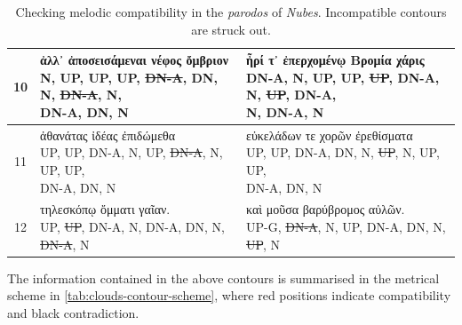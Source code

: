\documentclass[twoside]{article}
\begin{document}
\begin{table}[ht]
{\begin{tabular}{c l l}
            \hline
            
            10 &
            \makecell[l]{\textgreek{ἀλλ᾽ ἀποσεισάμεναι νέφος ὄμβριον}\\
            N, UP, UP, UP, \sout{DN-A}, DN, N, \sout{DN-A}, N,\\ 
            DN-A, DN, N} & %
            \makecell[l]{\textgreek{ἦρί τ᾽ ἐπερχομένῳ Βρομία χάρις}\\
            DN-A, N, UP, UP, \sout{UP}, DN-A, N, \sout{UP}, DN-A,\\ 
            N, DN-A, N} \\

            \hline
            
            11 &
            \makecell[l]{\textgreek{ἀθανάτας ἰδέας ἐπιδώμεθα}\\
            UP, UP, DN-A, N, UP, \sout{DN-A}, N, UP, UP,\\
            DN-A, DN, N} & %
            \makecell[l]{\textgreek{εὐκελάδων τε χορῶν ἐρεθίσματα}\\
            UP, UP, DN-A, DN, N, \sout{UP}, N, UP, UP,\\ 
            DN-A, DN, N} \\

            \hline
            
            12 &
            \makecell[l]{\textgreek{τηλεσκόπῳ ὄμματι γαῖαν.}\\
            UP, \sout{UP}, DN-A, N, DN-A, DN, N, \sout{DN-A}, N} & %
            \makecell[l]{\textgreek{καὶ μοῦσα βαρύβρομος αὐλῶν.}\\
            UP-G, \sout{DN-A}, N, UP, DN-A, DN, N, \sout{UP}, N} \\
            \hline
        \end{tabular}
    }
    \caption{Checking melodic compatibility in the \textit{parodos} of \textit{Nubes}. Incompatible contours are struck out.}
    \label{tab:clouds-contour}
\end{table}

The information contained in the above contours is summarised in the metrical scheme in \autoref{tab:clouds-contour-scheme}, where red positions indicate compatibility and black contradiction.
\end{document}
